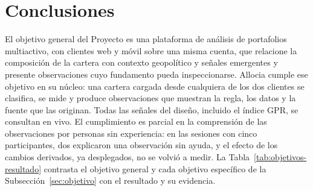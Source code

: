 \chapter{Conclusiones}\label{chap:conclusiones}

El objetivo general del Proyecto es una plataforma de análisis de portafolios multiactivo, con clientes web y móvil sobre una misma cuenta, que relacione la composición de la cartera con contexto geopolítico y señales emergentes y presente observaciones cuyo fundamento pueda inspeccionarse. Allocia cumple ese objetivo en su núcleo: una cartera cargada desde cualquiera de los dos clientes se clasifica, se mide y produce observaciones que muestran la regla, los datos y la fuente que las originan. Todas las señales del diseño, incluido el índice GPR, se consultan en vivo. El cumplimiento es parcial en la comprensión de las observaciones por personas sin experiencia: en las sesiones con cinco participantes, dos explicaron una observación sin ayuda, y el efecto de los cambios derivados, ya desplegados, no se volvió a medir. La Tabla~\ref{tab:objetivos-resultado} contrasta el objetivo general y cada objetivo específico de la Subsección~\ref{sec:objetivo} con el resultado y su evidencia.


